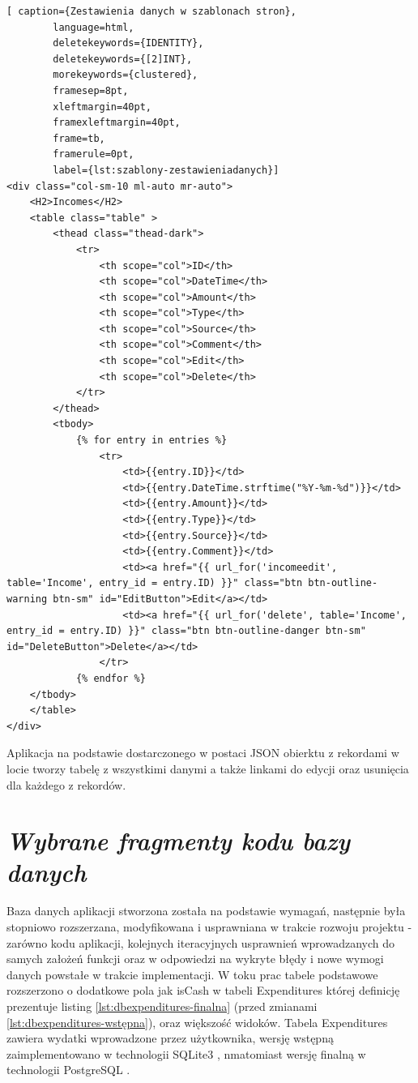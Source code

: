 \documentclass[a4paper, 10pt, twoside, openright]{report}
\newcommand{\customstylesection}[1]{\textbf{\textit{#1}}}
\begin{document}
\begin{large}
\begin{minipage}{\textwidth}
    \begin{lstlisting}[ caption={Zestawienia danych w szablonach stron},
        language=html,
        deletekeywords={IDENTITY},
        deletekeywords={[2]INT},
        morekeywords={clustered},
        framesep=8pt,
        xleftmargin=40pt,
        framexleftmargin=40pt,
        frame=tb,
        framerule=0pt,
        label={lst:szablony-zestawieniadanych}]
<div class="col-sm-10 ml-auto mr-auto">
    <H2>Incomes</H2>
    <table class="table" >
        <thead class="thead-dark">
            <tr>
                <th scope="col">ID</th>
                <th scope="col">DateTime</th>
                <th scope="col">Amount</th>
                <th scope="col">Type</th>
                <th scope="col">Source</th>
                <th scope="col">Comment</th>
                <th scope="col">Edit</th>
                <th scope="col">Delete</th>
            </tr>
        </thead>
        <tbody>
            {% for entry in entries %}
                <tr>
                    <td>{{entry.ID}}</td>
                    <td>{{entry.DateTime.strftime("%Y-%m-%d")}}</td>
                    <td>{{entry.Amount}}</td>
                    <td>{{entry.Type}}</td>
                    <td>{{entry.Source}}</td>
                    <td>{{entry.Comment}}</td>
                    <td><a href="{{ url_for('incomeedit', table='Income', entry_id = entry.ID) }}" class="btn btn-outline-warning btn-sm" id="EditButton">Edit</a></td>
                    <td><a href="{{ url_for('delete', table='Income', entry_id = entry.ID) }}" class="btn btn-outline-danger btn-sm" id="DeleteButton">Delete</a></td>
                </tr>
            {% endfor %}
    </tbody>
    </table>
</div>\end{lstlisting}
\end{minipage}
{Aplikacja na podstawie dostarczonego w postaci JSON obierktu z rekordami w 
locie tworzy tabelę z wszystkimi danymi a także linkami do edycji oraz usunięcia
 dla każdego z rekordów.}

\section{\customstylesection{Wybrane fragmenty kodu bazy danych}}
{Baza danych aplikacji stworzona została na podstawie wymagań, następnie była 
stopniowo rozszerzana, modyfikowana i usprawniana w trakcie rozwoju projektu - 
zarówno kodu aplikacji, kolejnych iteracyjnych usprawnień wprowadzanych do 
samych założeń funkcji oraz w odpowiedzi na wykryte błędy i nowe wymogi danych 
powstałe w trakcie implementacji. W toku prac tabele podstawowe rozszerzono 
o dodatkowe pola jak isCash w tabeli Expenditures której definicję prezentuje 
listing \ref*{lst:dbexpenditures-finalna} (przed zmianami 
\ref*{lst:dbexpenditures-wstępna}), oraz większość widoków. Tabela Expenditures 
zawiera wydatki wprowadzone przez użytkownika, wersję wstępną zaimplementowano 
w technologii SQLite3 \cite{SQLite}, nmatomiast wersję finalną w technologii 
PostgreSQL \cite{PostgreSQL}.}


\end{large}
\end{document}
